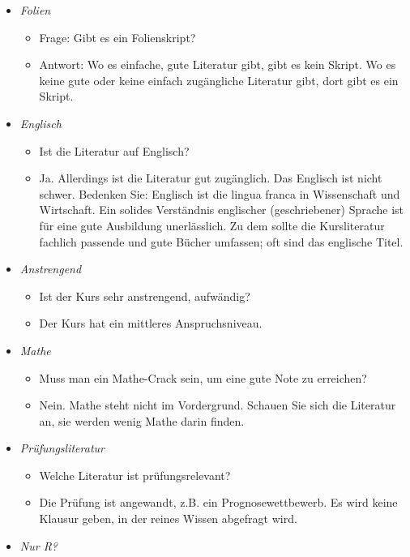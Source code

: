 \documentclass[
]{book}
\providecommand{\tightlist}{%
  \setlength{\itemsep}{0pt}\setlength{\parskip}{0pt}}
\begin{document}
\begin{itemize}
\tightlist
\item
  \emph{Folien}

  \begin{itemize}
  \tightlist
  \item
    Frage: Gibt es ein Folienskript?
  \item
    Antwort: Wo es einfache, gute Literatur gibt, gibt es kein Skript. Wo es keine gute oder keine einfach zugängliche Literatur gibt, dort gibt es ein Skript.
  \end{itemize}
\item
  \emph{Englisch}

  \begin{itemize}
  \tightlist
  \item
    Ist die Literatur auf Englisch?
  \item
    Ja. Allerdings ist die Literatur gut zugänglich. Das Englisch ist nicht schwer. Bedenken Sie: Englisch ist die lingua franca in Wissenschaft und Wirtschaft. Ein solides Verständnis englischer (geschriebener) Sprache ist für eine gute Ausbildung unerlässlich. Zu dem sollte die Kursliteratur fachlich passende und gute Bücher umfassen; oft sind das englische Titel.
  \end{itemize}
\item
  \emph{Anstrengend}

  \begin{itemize}
  \tightlist
  \item
    Ist der Kurs sehr anstrengend, aufwändig?
  \item
    Der Kurs hat ein mittleres Anspruchsniveau.
  \end{itemize}
\item
  \emph{Mathe}

  \begin{itemize}
  \tightlist
  \item
    Muss man ein Mathe-Crack sein, um eine gute Note zu erreichen?
  \item
    Nein. Mathe steht nicht im Vordergrund. Schauen Sie sich die Literatur an, sie werden wenig Mathe darin finden.
  \end{itemize}
\item
  \emph{Prüfungsliteratur}

  \begin{itemize}
  \tightlist
  \item
    Welche Literatur ist prüfungsrelevant?
  \item
    Die Prüfung ist angewandt, z.B. ein Prognosewettbewerb. Es wird keine Klausur geben, in der reines Wissen abgefragt wird.
  \end{itemize}
\item
  \emph{Nur R?}


\end{itemize}
\end{document}
